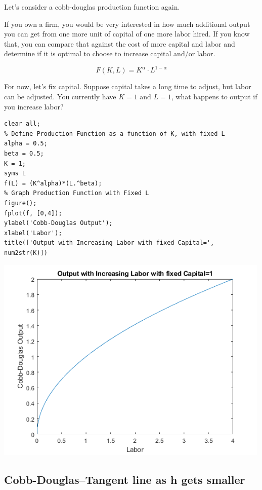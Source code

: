 \documentclass[
]{book}
\begin{document}
Let's consider a cobb-douglas production function again.

If you own a firm, you would be very interested in how much additional
output you can get from one more unit of capital of one more labor
hired. If you know that, you can compare that against the cost of more
capital and labor and determine if it is optimal to choose to increase
capital and/or labor.

\[F(K,L)=K^{\alpha } \cdot L^{1-\alpha }\]

For now, let's fix capital. Suppose capital takes a long time to adjust,
but labor can be adjusted. You currently have \(K=1\) and \(L=1\), what
happens to output if you increase labor?

\begin{verbatim}
clear all;
% Define Production Function as a function of K, with fixed L
alpha = 0.5;
beta = 0.5;
K = 1;
syms L
f(L) = (K^alpha)*(L.^beta);
% Graph Production Function with Fixed L
figure();
fplot(f, [0,4]);
ylabel('Cobb-Douglas Output');
xlabel('Labor');
title(['Output with Increasing Labor with fixed Capital=', num2str(K)])
\end{verbatim}

\includegraphics[width=5.20833in,height=\textheight]{img/derivative_hslope_cobb_douglas_images/figure_0.png}

\hypertarget{cobb-douglastangent-line-as-h-gets-smaller}{%
\subsection{Cobb-Douglas--Tangent line as h gets smaller}\label{cobb-douglastangent-line-as-h-gets-smaller}}
\end{document}
